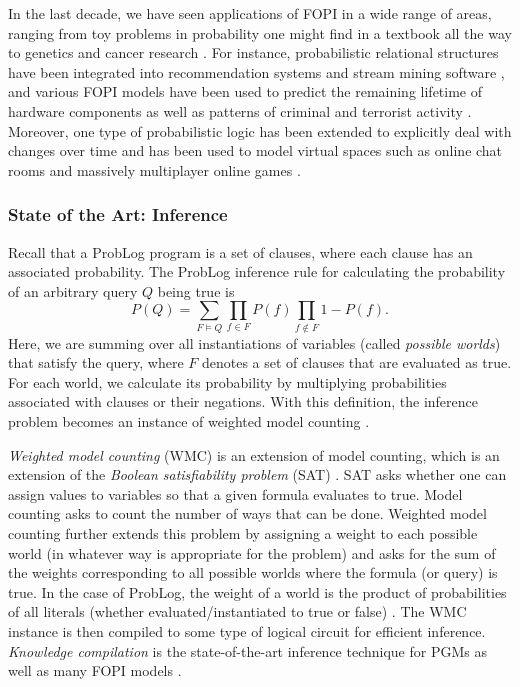 \documentclass{article}
\begin{document}
In the last decade, we have seen applications of FOPI in a wide range of areas,
ranging from toy problems in probability one might find in a textbook
\cite{DBLP:conf/ijcai/DriesKDBR17} all the way to genetics
\cite{DBLP:journals/jcb/SakhanenkoG12} and cancer research
\cite{DBLP:conf/ilp/Corte-RealD017}. For instance, probabilistic relational
structures have been integrated into recommendation systems
\cite{DBLP:journals/corr/YangKAGN16} and stream mining software
\cite{DBLP:conf/icdm/ChandraSKTA14}, and various FOPI models have been used to
predict the remaining lifetime of hardware components
\cite{vlasselaer2012statistical} as well as patterns of criminal and terrorist
activity \cite{DBLP:conf/sdm/DelaneyFCWJ10}. Moreover, one type of probabilistic
logic has been extended to explicitly deal with changes over time and has been
used to model virtual spaces such as online chat rooms and massively multiplayer
online games \cite{DBLP:conf/pkdd/ThonLR08,DBLP:journals/ml/ThonLR11}.

\subsubsection{State of the Art: Inference}

Recall that a ProbLog program is a set of clauses, where each clause has an
associated probability. The ProbLog inference rule
\cite{DBLP:series/synthesis/2016Raedt,DBLP:conf/iclp/Sato95} for calculating the
probability of an arbitrary query $Q$ being true is
\[
  P(Q) = \sum_{F \models Q} \prod_{f \in F} P(f) \prod_{f \not\in F} 1 -
  P(f).
\]
Here, we are summing over all instantiations of variables (called \emph{possible
worlds}) that satisfy the query, where $F$ denotes a set of clauses that are
evaluated as true. For each world, we calculate its probability by multiplying
probabilities associated with clauses or their negations. With this
definition, the inference problem becomes an instance of weighted model
counting \cite{DBLP:series/synthesis/2016Raedt}.

\emph{Weighted model counting} (WMC) is an extension of model counting, which is
an extension of the \emph{Boolean satisfiability problem} (SAT)
\cite{DBLP:journals/ai/ChaviraD08}. SAT asks whether one can assign values to
variables so that a given formula evaluates to true. Model counting asks to
count the number of ways that can be done. Weighted model counting further
extends this problem by assigning a weight to each possible world (in whatever
way is appropriate for the problem) and asks for the sum of the weights
corresponding to all possible worlds where the formula (or query) is true. In
the case of ProbLog, the weight of a world is the product of probabilities of
all literals (whether evaluated/instantiated to true or false)
\cite{DBLP:series/synthesis/2016Raedt}. The WMC instance is then compiled to
some type of logical circuit for efficient inference. \emph{Knowledge
  compilation} \cite{DBLP:conf/ijcai/BroeckTMDR11} is the state-of-the-art
inference technique for PGMs as well as many FOPI models
\cite{DBLP:series/synthesis/2016Raedt}.
\end{document}
